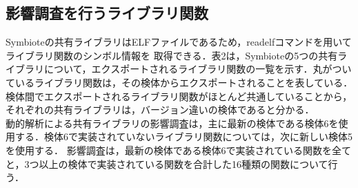 \documentclass[submit,techreq,noauthor]{eco}	%
\begin{document}
\subsection{影響調査を行うライブラリ関数}
Symbioteの共有ライブラリはELFファイルであるため，readelfコマンドを用いてライブラリ関数のシンボル情報を
取得できる．表2は，Symbioteの5つの共有ライブラリについて，エクスポートされるライブラリ関数の一覧を示す．丸がついているライブラリ関数は，その検体からエクスポートされることを表している．
検体間でエクスポートされるライブラリ関数がほとんど共通していることから，それぞれの共有ライブラリは，バージョン違いの検体であると分かる．\\
動的解析による共有ライブラリの影響調査は，主に最新の検体である検体6を使用する．検体6で実装されていないライブラリ関数については，次に新しい検体5を使用する．
影響調査は，最新の検体である検体6で実装されている関数を全てと，3つ以上の検体で実装されている関数を合計した16種類の関数について行う．\\
\end{document}

